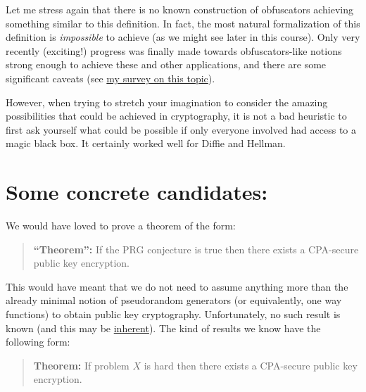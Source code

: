 Let me stress again that there is no known construction of obfuscators
achieving something similar to this definition. In fact, the most
natural formalization of this definition is \emph{impossible} to achieve
(as we might see later in this course). Only very recently (exciting!)
progress was finally made towards obfuscators-like notions strong enough
to achieve these and other applications, and there are some significant
caveats (see \href{https://eprint.iacr.org/2016/210}{my survey on this
topic}).

However, when trying to stretch your imagination to consider the amazing
possibilities that could be achieved in cryptography, it is not a bad
heuristic to first ask yourself what could be possible if only everyone
involved had access to a magic black box. It certainly worked well for
Diffie and Hellman.

\section{Some concrete candidates:}\label{Some-concrete-candidates}

We would have loved to prove a theorem of the form:

\begin{quote}
\textbf{``Theorem'':} If the PRG conjecture is true then there exists a
CPA-secure public key encryption.
\end{quote}

This would have meant that we do not need to assume anything more than
the already minimal notion of pseudorandom generators (or equivalently,
one way functions) to obtain public key cryptography. Unfortunately, no
such result is known (and this may be
\href{https://www.cs.virginia.edu/~mohammad/files/papers/MerkleFull.pdf}{inherent}).
The kind of results we know have the following form:

\begin{quote}
\textbf{Theorem:} If problem \(X\) is hard then there exists a
CPA-secure public key encryption.
\end{quote}

